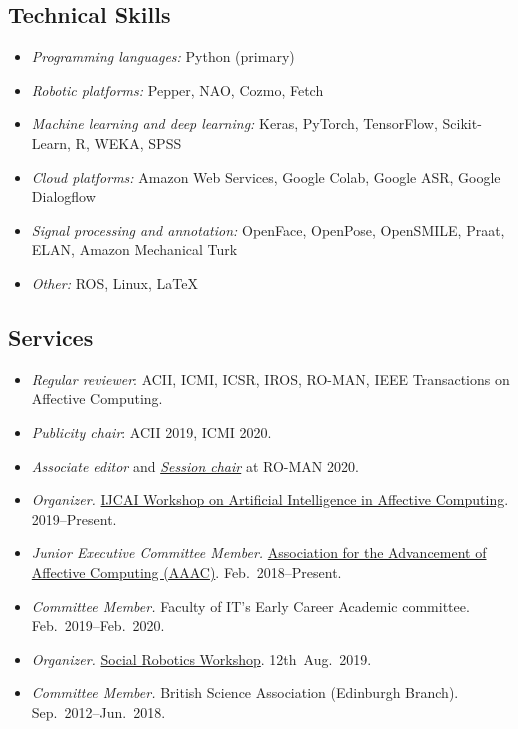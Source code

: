 \documentclass[11pt,letterpaper]{article}
\begin{document}
\subsection*{Technical Skills}
\begin{itemize}
  \item \emph{Programming languages:} Python (primary)
  \item \emph{Robotic platforms:} Pepper, NAO, Cozmo, Fetch
  \item \emph{Machine learning and deep learning:} Keras, PyTorch, TensorFlow, Scikit-Learn, R, WEKA, SPSS
  \item \emph{Cloud platforms:} Amazon Web Services, Google Colab, Google ASR, Google Dialogflow
  \item \emph{Signal processing and annotation:} OpenFace, OpenPose, OpenSMILE, Praat, ELAN, Amazon Mechanical Turk
  \item \emph{Other:} ROS, Linux, \LaTeX
\end{itemize}

\subsection*{Services}
\begin{itemize}
  \item \emph{Regular reviewer}: ACII, ICMI, ICSR, IROS, RO-MAN, IEEE Transactions on Affective Computing.
  \item \emph{Publicity chair}: ACII 2019, ICMI 2020.
  \item \emph{Associate editor} and \href{https://underline.io/events/28/sessions?eventSessionId=365}{\emph{Session chair}} at RO-MAN 2020.
  \item \emph{Organizer.} \href{http://kdd.cs.ksu.edu/Workshops/IJCAI-2020-AffComp/index.html}{IJCAI Workshop on Artificial Intelligence in Affective Computing}. 2019--Present.
  \item \emph{Junior Executive Committee Member.}  \href{https://aaac.world/}{Association for the Advancement of Affective Computing (AAAC)}. Feb.~2018--Present.
  \item \emph{Committee Member.} Faculty of IT's Early Career Academic committee. Feb.~2019--Feb.~2020.
  \item \emph{Organizer.} \href{https://sites.google.com/monash.edu/socialroboticsworkshop/home}{Social Robotics Workshop}. 12th~Aug.~2019.
  \item \emph{Committee Member.} British Science Association (Edinburgh Branch). Sep.~2012--Jun.~2018.
\end{itemize}
\end{document}
